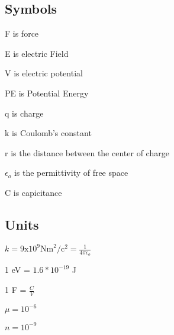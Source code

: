 \subsection{Symbols}
F is force

E is electric Field

V is electric potential
 
PE is Potential Energy

q is charge

k is Coulomb's constant

r is the distance between the center of charge

$\epsilon_o$ is the permittivity of free space

C is capicitance


\subsection{Units}
$k=9\text{x}10^9 \text{Nm}^2/\text{c}^2 =\frac{1}{4\pi\epsilon _o}$

1 eV = $1.6*10^{-19}$ J

1 F = $\frac{C}{V}$

$\mu = 10^{-6}$

$n = 10^{-9}$